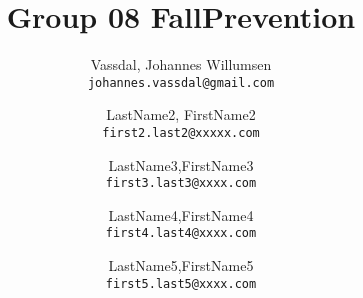 \documentclass[12pt,a4paper]{report}
\title{Group 08 FallPrevention}
\author{
  Vassdal, Johannes Willumsen\\
  \texttt{johannes.vassdal@gmail.com}
  \and
  LastName2, FirstName2\\
  \texttt{first2.last2@xxxxx.com}
  \and
  LastName3,FirstName3\\
  \texttt{first3.last3@xxxx.com}
    \and
  LastName4,FirstName4\\
  \texttt{first4.last4@xxxx.com}
    \and
  LastName5,FirstName5\\
  \texttt{first5.last5@xxxx.com}
}
\begin{document}
\onehalfspacing
\maketitle
\tableofcontents



%




\end{document}
